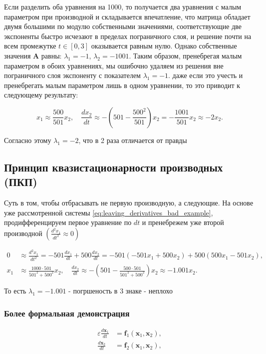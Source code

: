 	Если разделить оба уравнения на 1000, то получается два уравнения с малым параметром при производной и складывается впечатление, что матрица обладает двумя большими по модулю собственными значениями, соответствующие две экспоненты быстро исчезают в пределах пограничного слоя, и решение почти на всем промежутке $t \in [0, 3]$ оказывается равным нулю. Однако собственные значения $\mathbf{A}$ равны: $\lambda_1 = -1$, $\lambda_2 = -1001$. Таким образом, пренебрегая малым параметром в обоих уравнениях, мы ошибочно удаляем из решения вне пограничного слоя экспоненту с показателем $\lambda_1 = -1$. даже если это учесть и пренебрегать малым параметром лишь в одном уравнении, то это приводит к следующему результату:
	
	\begin{equation}
		x_1 \approx \frac{500}{501} x_2, \quad
		\frac{dx_2}{dt} \approx -\left( 501 - \frac{500^2}{501} \right) x_2 = -\frac{1001}{501} x_2 \approx -2 x_2.
	\end{equation}
	
	Согласно этому $\lambda_1 = -2$, что в 2 раза отличается от правды
	
	\subsection{Принцип квазистационарности производных (ПКП)}
	
	Суть в том, чтобы отбрасывать не первую производную, а следующие. На основе уже рассмотренной системы \eqref{eq:leaving_derivatives_bad_example}, продифференцируем первое уравнение по $dt$ и пренебрежем уже второй производной $\left(\frac{d^2x_1}{dt^2}\approx 0\right)$
	
	\begin{align}
		0 &\approx \frac{d^2 x_1}{dt^2} = -501 \frac{dx_1}{dt} + 500 \frac{dx_2}{dt} = -501(-501x_1 + 500x_2) + 500(500x_1 - 501x_2), \\
		x_1 &\approx \frac{1000 \cdot 501}{501^2 + 500^2} x_2, \quad \frac{dx_2}{dt} \approx -\left( 501 - \frac{500 \cdot 501}{501^2 + 500^2} \right) x_2 \approx -1.001 x_2.
	\end{align}
	
	То есть $\lambda_1 = -1.001$ - погршеность в 3 знаке - неплохо
	
	\subsubsection{Более формальная демонстрация}
	
	\begin{align}
		\varepsilon \frac{d\mathbf{x}_1}{dt} &= \mathbf{f}_1(\mathbf{x}_1, \mathbf{x}_2), \\
		\frac{d\mathbf{x}_2}{dt} &= \mathbf{f}_2(\mathbf{x}_1, \mathbf{x}_2),
	\end{align}
	
